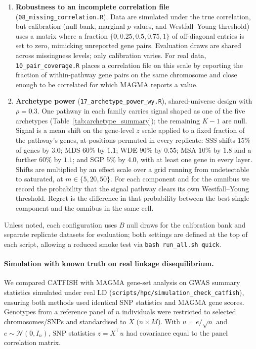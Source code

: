 \begin{enumerate}
\item \textbf{Robustness to an incomplete correlation file}
(\texttt{08\_missing\_correlation.R}). Data are simulated under the true correlation, but calibration (null bank, marginal $p$-values, and Westfall--Young threshold) uses a matrix where a fraction $\{0,0.25,0.5,0.75,1\}$ of off-diagonal entries is set to zero, mimicking unreported gene pairs. Evaluation draws are shared across missingness levels; only calibration varies. For real data, \texttt{10\_pair\_coverage.R} places a correlation file on this scale by reporting the fraction of within-pathway gene pairs on the same chromosome and close enough to be correlated for which MAGMA reports a value.

\item \textbf{Archetype power} (\texttt{17\_archetype\_power\_wy.R}), shared-universe design with $\rho=0.3$. One pathway in each family carries signal shaped as one of the five archetypes (Table~\ref{tab:archetype_summary}); the remaining $K-1$ are null. Signal is a mean shift on the gene-level $z$ scale applied to a fixed fraction of the pathway's genes, at positions permuted in every replicate: SSS shifts $15\%$ of genes by $3.0$; MDS $60\%$ by $1.1$; WDE $90\%$ by $0.55$; MSA $10\%$ by $1.8$ and a further $60\%$ by $1.1$; and SGP $5\%$ by $4.0$, with at least one gene in every layer. Shifts are multiplied by an effect scale over a grid running from undetectable to saturated, at $m\in\{5,20,50\}$. For each component and for the omnibus we record the probability that the signal pathway clears its own Westfall--Young threshold. Regret is the difference in that probability between the best single component and the omnibus in the same cell.
\end{enumerate}

Unless noted, each configuration uses $B$ null draws for the calibration bank and separate replicate datasets for evaluation; both settings are defined at the top of each script, allowing a reduced smoke test via \texttt{bash run\_all.sh quick}.

\paragraph{Simulation with known truth on real linkage disequilibrium.}
We compared CATFISH with MAGMA gene-set analysis on GWAS summary statistics simulated under real LD (\texttt{scripts/hpc/\allowbreak simulation\_check\_catfish}), ensuring both methods used identical SNP statistics and MAGMA gene scores. Genotypes from a reference panel of $n$ individuals were restricted to selected chromosomes/SNPs and standardised to $X$ ($n\times M$). With $u=e/\sqrt{n}$ and $e\sim\mathcal{N}(0,I_n)$, SNP statistics $z=X^\top u$ had covariance equal to the panel correlation matrix. 

